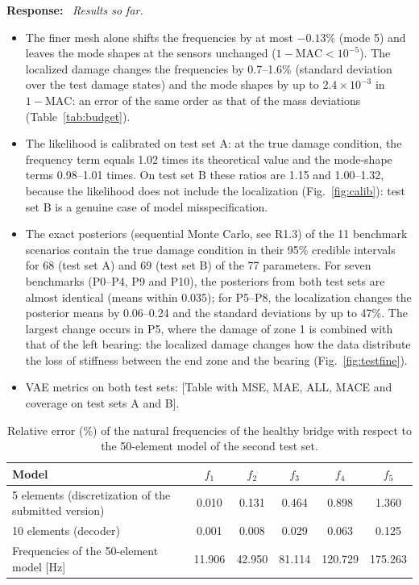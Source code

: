 \documentclass[11pt]{article}
\newenvironment{response}{\par\smallskip\noindent\color{resp}\textbf{Response:}\ }{\par}
\newcommand{\tbd}[1]{\textcolor{note}{\textsf{[#1]}}}
\begin{document}
\begin{response}
\textit{Results so far.}
\begin{itemize}[leftmargin=*]
\item The finer mesh alone shifts the frequencies by at most $-0.13\%$ (mode 5) and leaves the mode shapes at the sensors
unchanged ($1-\mathrm{MAC}<10^{-5}$). The localized damage changes the frequencies by 0.7--1.6\% (standard deviation over
the test damage states) and the mode shapes by up to $2.4\times10^{-3}$ in $1-\mathrm{MAC}$: an error of the same order
as that of the mass deviations (Table~\ref{tab:budget}).
\item The likelihood is calibrated on test set A: at the true damage condition, the frequency term equals 1.02 times its
theoretical value and the mode-shape terms 0.98--1.01 times. On test set B these ratios are 1.15 and 1.00--1.32,
because the likelihood does not include the localization (Fig.~\ref{fig:calib}): test set B is a genuine case of model
misspecification.
\item The exact posteriors (sequential Monte Carlo, see R1.3) of the 11 benchmark scenarios contain the true damage
condition in their 95\% credible intervals for 68 (test set A) and 69 (test set B) of the 77 parameters. For seven
benchmarks (P0--P4, P9 and P10), the posteriors from both test sets are almost identical (means within 0.035); for
P5--P8, the localization changes the posterior means by 0.06--0.24 and the standard deviations by up to 47\%. The largest
change occurs in P5, where the damage of zone 1 is combined with that of the left bearing: the localized damage changes
how the data distribute the loss of stiffness between the end zone and the bearing (Fig.~\ref{fig:testfine}).
\item VAE metrics on both test sets: \tbd{Table with MSE, MAE, ALL, MACE and coverage on test sets A and B}.
\end{itemize}
\end{response}

\begin{table}[H]
\centering\small
\caption{Relative error (\%) of the natural frequencies of the healthy bridge with respect to the 50-element model of
the second test set.}
\label{tab:mesh}
\begin{tabular}{lccccc}
\toprule
Model & $f_1$ & $f_2$ & $f_3$ & $f_4$ & $f_5$ \\
\midrule
5 elements (discretization of the submitted version) & 0.010 & 0.131 & 0.464 & 0.898 & 1.360 \\
10 elements (decoder) & 0.001 & 0.008 & 0.029 & 0.063 & 0.125 \\
\midrule
Frequencies of the 50-element model [Hz] & 11.906 & 42.950 & 81.114 & 120.729 & 175.263 \\
\bottomrule
\end{tabular}
\end{table}
\end{document}
